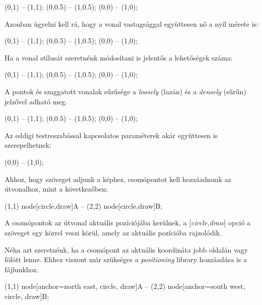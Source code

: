 \begin{tikzcode}
\draw [thin] (0,1) -- (1,1);
\draw [thick] (0,0.5) -- (1,0.5);	
 (0,0) -- (1,0);
\end{tikzcode}

Azonban ügyelni kell rá, hogy a vonal vastagsággal együttesen nő a nyíl mérete is:

\begin{tikzcode}
\draw [->, thin] (0,1) -- (1,1);
\draw [->, thick] (0,0.5) -- (1,0.5);	
 (0,0) -- (1,0);
\end{tikzcode}

Ha a vonal stílusát szeretnénk módosítani is jelentős a lehetőségek száma:

\begin{tikzcode}
\draw [dotted] (0,1) -- (1,1);
\draw [dashed] (0,0.5) -- (1,0.5);	
\draw [dashdotted] (0,0) -- (1,0);
\end{tikzcode}

A pontok és szaggatott vonalak sűrűsége a \textit{loosely} (lazán) és a \textit{densely} (sűrűn) jelzővel adható meg.
\begin{tikzcode}
\draw [dashed] (0,1) -- (1,1);
 (0,0.5) -- (1,0.5);	
 (0,0) -- (1,0);
\end{tikzcode}

Az eddigi testreszabással kapcsolatos paraméterek akár együttesen is szerepelhetnek:

\begin{tikzcode}
 (0,0) -- (1,0);
\end{tikzcode}

Ahhoz, hogy szöveget adjunk a képhez, csomópontot kell hozzáadnunk az útvonalhoz, mint a következőben:

\begin{tikzcode}
\draw 
	(1,1) node[circle,draw]{A} 
	-- 
	(2,2) node[circle,draw]{B};	
\end{tikzcode}

A csomópontok az útvonal aktuális pozíciójába kerülnek, a [\textit{circle,draw}] opció a szöveget egy körrel veszi körül, amely az aktuális pozícióba rajzolódik.

Néha azt szeretnénk, ha a csomópont az aktuális koordináta jobb oldalán vagy fölött lenne. Ehhez viszont már szükséges a \textit{positioning} library hozzáadása is a fájlunkhoz.

\begin{tikzcode}
\draw 
(1,1) node[anchor=north east, circle, draw]{A} 
	-- 
(2,2) node[anchor=south west, circle, draw]{B}; 
\end{tikzcode}

